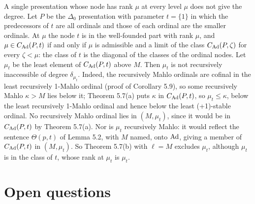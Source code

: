 \documentclass[11pt]{article}
\begin{document}
\begin{statement} A single presentation whose node has rank $\mu$ at every level $\mu$ does not
give the degree. Let $P$ be the $\Delta_0$ presentation with parameter $t = \{1\}$ in which the predecessors of $t$
are all ordinals and those of each ordinal are the smaller ordinals. At $\mu$ the node $t$ is in the well-founded part
with rank $\mu$, and $\mu \in C_{\mathrm{Ad}}(P,t)$ if and only if $\mu$ is admissible and a limit of the class $C_{\mathrm{Ad}}(P,\zeta)$ for
every $\zeta < \mu$: the class of $t$ is the diagonal of the classes of the ordinal nodes. Let $\mu_t$ be the least
element of $C_{\mathrm{Ad}}(P,t)$ above $M$. Then $\mu_t$ is not recursively inaccessible of degree $\delta_{\mu_t}$. Indeed,
the recursively Mahlo ordinals are cofinal in the least recursively 1-Mahlo ordinal (proof of Corollary 5.9), so
some recursively Mahlo $\kappa > M$ lies below it; Theorem 5.7(a) puts $\kappa$ in $C_{\mathrm{Ad}}(P,t)$, so $\mu_t \le \kappa$,
below the least recursively 1-Mahlo ordinal and hence below the least (+1)-stable ordinal. No recursively Mahlo ordinal lies in $(M, \mu_t)$,
since it would be in $C_{\mathrm{Ad}}(P,t)$ by Theorem 5.7(a). Nor is $\mu_t$ recursively Mahlo: it would reflect the sentence
$\Theta(p,t)$ of Lemma 5.2, with $M$ named, onto $\mathrm{Ad}$, giving a member of $C_{\mathrm{Ad}}(P,t)$ in $(M, \mu_t)$. So Theorem
5.7(b) with $\ell = M$ excludes $\mu_t$, although $\mu_t$ is in the class of $t$, whose rank at $\mu_t$ is $\mu_t$.
\end{statement}

\section{Open questions}
\end{document}

